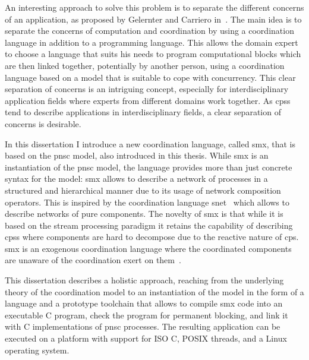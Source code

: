 An interesting approach to solve this problem is to separate the different concerns of an application, as proposed by Gelernter and Carriero in~\cite{gelernter1992}.
The main idea is to separate the concerns of computation and coordination by using a coordination language in addition to a programming language.
This allows the domain expert to choose a language that suits his needs to program computational blocks which are then linked together, potentially by another person, using a coordination language based on a model that is suitable to cope with concurrency.
This clear separation of concerns is an intriguing concept, especially for interdisciplinary application fields where experts from different domains work together.
As \glspl{cps} tend to describe applications in interdisciplinary fields, a clear separation of concerns is desirable.

In this dissertation I introduce a new coordination language, called \gls*{smx}, that is based on the \gls{pnsc} model, also introduced in this thesis.
While \gls*{smx} is an instantiation of the \gls{pnsc} model, the language provides more than just concrete syntax for the model:
\Gls*{smx} allows to describe a network of processes in a structured and hierarchical manner due to its usage of network composition operators.
This is inspired by the coordination language \gls*{snet}~\cite{grelck2010} which allows to describe networks of pure components.
The novelty of \gls*{smx} is that while it is based on the stream processing paradigm it retains the capability of describing \glspl{cps} where components are hard to decompose due to the reactive nature of \gls{cps}.
\Gls*{smx} is an exogenous coordination language where the coordinated components are unaware of the coordination exert on them~\cite{arbab2006}.

This dissertation describes a holistic approach, reaching from the underlying theory of the coordination model to an instantiation of the model in the form of a language and a prototype toolchain that allows to compile \gls*{smx} code into an executable C program, check the program for permanent blocking, and link it with C implementations of \gls{pnsc} processes.
The resulting application can be executed on a platform with support for ISO C, POSIX threads, and a Linux operating system.


